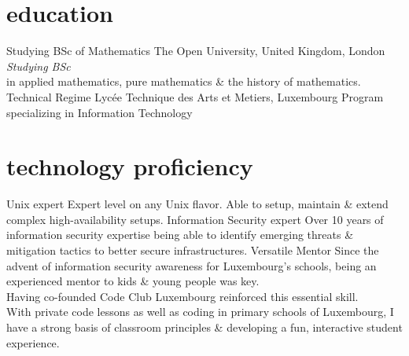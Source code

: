\documentclass[a4paper]{friggeri-cv} %
\begin{document}
\section{education}
\begin{entrylist}
{Studying BSc {\normalfont of Mathematics}}
{The Open University, United Kingdom, London}
{\emph{Studying BSc} \\ in applied mathematics, pure mathematics \& the history of mathematics.}
{Technical Regime}
{Lyc\'{e}e Technique des Arts et Metiers, Luxembourg}
{Program specializing in Information Technology}
\end{entrylist}


\section{technology proficiency}

\begin{entrylist}
{Unix expert}
{}
{Expert level on any Unix flavor. Able to setup, maintain \& extend complex high-availability setups.}
{Information Security expert}
{}
{Over 10 years of information security expertise being able to identify emerging threats \& mitigation tactics to better secure infrastructures.}
{Versatile Mentor}
{}
{Since the advent of information security awareness for Luxembourg's schools, being an experienced mentor to kids \& young people was key. \\
Having co-founded Code Club Luxembourg reinforced this essential skill. \\
With private code lessons as well as coding in primary schools of Luxembourg, I have a strong basis of classroom principles \& developing a fun, interactive student experience.}
\end{entrylist}
\end{document}
